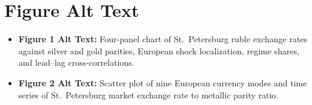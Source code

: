 \documentclass[11pt,a4paper]{article}
\begin{document}
\section*{Figure Alt Text}
\begin{itemize}
\item \textbf{Figure 1 Alt Text:} Four-panel chart of St.~Petersburg ruble exchange rates against silver and gold parities, European shock localization, regime shares, and lead--lag cross-correlations.
\item \textbf{Figure 2 Alt Text:} Scatter plot of nine European currency modes and time series of St.~Petersburg market exchange rate to metallic parity ratio.
\end{itemize}
\end{document}

